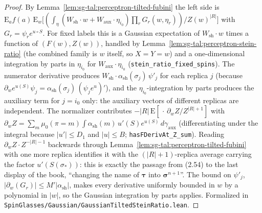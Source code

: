 \begin{proof}
  \leanok
By Lemma~\ref{lem:sg-tal:perceptron-tilted-fubini} the left side is $\mathrm E_{a}f(a)\,\mathrm E_w\bigl[(\int_\eta (W_{\mathrm{sh}}\cdot w+W_{\mathrm{aux}}\cdot\eta_{i_0})\prod_r G_r(w,\eta_r))/Z(w)^{|R|}\bigr]$ with $G_r=\psi_re^{u\circ S}$.
For fixed labels this is a Gaussian expectation of $W_{\mathrm{sh}}\cdot w$ times a function of $(F(w),Z(w))$, handled by Lemma~\ref{lem:sg-tal:perceptron-stein-ratio} (the combined family is $w$ itself, so $X=Y=w$) and a one-dimensional integration by parts in
$\eta_{i_0}$ for $W_{\mathrm{aux}}\cdot\eta_{i_0}$ (\texttt{stein\_ratio\_fixed\_spins}). The numerator derivative produces $W_{\mathrm{sh}}\cdot\alpha_{\mathrm{sh}}(\sigma_j)\,\psi'_j$ for each replica $j$ (because $\partial_w e^{u(S)}\psi_j=\alpha_{\mathrm{sh}}(\sigma_j)\,(\psi_je^{u})'$), and
the $\eta_{i_0}$-integration by parts produces the auxiliary term for $j=i_0$ only: the auxiliary vectors of different replicas are independent.
The normalizer contributes $-|R|\,\mathrm E[\,\cdot\,\partial_wZ/Z^{|R|+1}]$ with $\partial_{w}Z=\sum_m\mu_0(\pi=m)\int\alpha_{\mathrm{sh}}(m)\,u'(S)e^{u(S)}\,d\gamma_{\mathrm{aux}}$ (differentiating under the integral because $|u'|\le D_1$ and $|u|\le B$; \texttt{hasFDerivAt\_Z\_sum}). Reading $\partial_wZ\cdot Z^{-|R|-1}$ backwards through Lemma~\ref{lem:sg-tal:perceptron-tilted-fubini} with one more replica identifies it with the $(|R|+1)$-replica average carrying the factor $u'(S(\sigma_*))$: this is exactly the passage from (2.54) to the last display of the book, ``changing the name of $\boldsymbol\tau$ into $\boldsymbol\sigma^{n+1}$''.
The bound on $\psi'_j$, $|\partial_w(G_r)|\le M'|\alpha_{\mathrm{sh}}|$, makes every derivative uniformly bounded in $w$ by a polynomial in $|w|$, so the Gaussian integration by parts applies. Formalized in \texttt{SpinGlasses/Gaussian/GaussianTiltedSteinRatio.lean}.
\end{proof}

